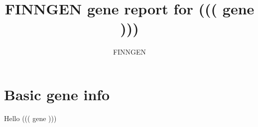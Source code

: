 \documentclass{article}
\begin{document}
\title {FINNGEN gene report for ((( gene ))) }
\author{FINNGEN}
\maketitle
\newpage
\newpage
\section{ Basic gene info }
Hello ((( gene )))
\end{document}
